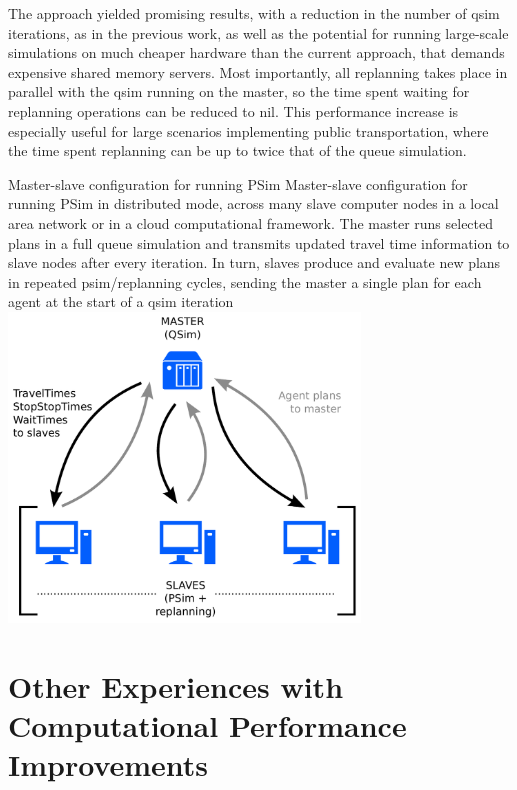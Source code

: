The approach yielded promising results, with a reduction in the number of \gls{qsim} iterations, as in the previous work, as well as the potential for running large-scale simulations on much cheaper hardware than the current approach, that demands expensive shared memory servers. Most importantly, all replanning takes place in parallel with the \gls{qsim} running on the master, so the time spent waiting for replanning operations can be reduced to nil. This performance increase is especially useful for large scenarios implementing public transportation, where the time spent replanning can be up to twice that of the queue simulation.

\createfigure%
{Master-slave configuration for running PSim}%
{Master-slave configuration for running PSim in distributed mode, across many slave computer nodes in a local area network or in a cloud computational framework. The master runs selected plans in a full queue simulation and transmits updated travel time information to slave nodes after every iteration. In turn, slaves produce and evaluate new plans in repeated \gls{psim}/replanning cycles, sending the master a single plan for each agent at the start of a \protect\gls{qsim} iteration}%
{\label{fig:distributedPSim}}%
{\includegraphics[width=0.7\textwidth, angle=0]{extending/figures/PSim/distributed}}%
{}


\chapter{Other Experiences with Computational Performance Improvements}
\label{ch:high-performance-computing}


